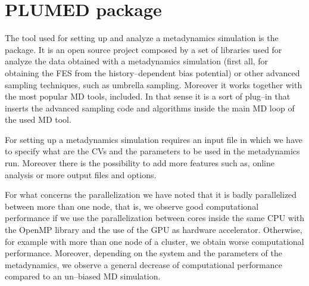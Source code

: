 \section{PLUMED package}
The tool used for setting up and analyze a metadynamics simulation is the \href{http://www.plumed.org}{\plumed} 
package. It is an open source project composed by a set of libraries used for analyze the data obtained with a 
metadynamics simulation (first all, for obtaining the \ac{FES} from the history--dependent bias potential) or 
other advanced sampling techniques, such as umbrella sampling. Moreover it works together with the most popular 
\ac{MD} tools, \gromacs included. In that sense it is a sort of plug--in that inserts the advanced sampling code 
and algorithms inside the main \ac{MD} loop of the used \ac{MD} tool.

For setting up a metadynamics simulation \plumed requires an input file in which we have to specify what are the 
\acp{CV} and the parameters to be used in the metadynamics run. Moreover there is the possibility to add more 
features such as, online analysis or more output files and options.

For what concerns the parallelization we have noted that it is badly parallelized between more than one node, 
that is, we observe good computational performance if we use the parallelization between cores inside the same 
CPU with the OpenMP library and the use of the GPU as hardware accelerator. Otherwise, for example with more than 
one node of a cluster, we obtain worse computational performance. Moreover, depending on the system and the 
parameters of the metadynamics, we observe a general decrease of computational performance compared to an 
un--biased \ac{MD} simulation.

%
%

\newpage
